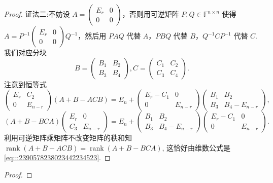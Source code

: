 \documentclass[../../main.tex]{subfiles}
\begin{document}
\begin{proof}
{\color{blue}证法二:}不妨设 $A = \begin{pmatrix} E_r & 0 \\ 0 & 0 \end{pmatrix}$，否则用可逆矩阵 $P, Q \in \mathbb{F}^{n \times n}$ 使得 $A = P^{-1} \begin{pmatrix} E_r & 0 \\ 0 & 0 \end{pmatrix} Q^{-1}$，然后用 $PAQ$ 代替 $A$，$PBQ$ 代替 $B$，$Q^{-1}CP^{-1}$ 代替 $C$. 我们对应分块
\[
B = \begin{pmatrix} B_1 & B_2 \\ B_3 & B_4 \end{pmatrix}, C = \begin{pmatrix} C_1 & C_2 \\ C_3 & C_4 \end{pmatrix}.
\]
注意到恒等式
\[
\begin{pmatrix}
E_r & C_2 \\
0 & E_{n - r}
\end{pmatrix}(A + B - ACB) = E_n + \begin{pmatrix}
E_r - C_1 & 0 \\
0 & E_{n - r}
\end{pmatrix}\begin{pmatrix}
B_1 & B_2 \\
B_3 & B_4 - E_{n - r}
\end{pmatrix},
\]
\[
(A + B - BCA)\begin{pmatrix}
E_r & 0 \\
C_3 & E_{n - r}
\end{pmatrix} = E_n + \begin{pmatrix}
B_1 & B_2 \\
B_3 & B_4 - E_{n - r}
\end{pmatrix}\begin{pmatrix}
E_r - C_1 & 0 \\
0 & E_{n - r}
\end{pmatrix}.
\]
利用可逆矩阵乘矩阵不改变矩阵的秩和知 $\operatorname{rank}(A + B - ACB) = \operatorname{rank}(A + B - BCA)$, 这恰好由维数公式是\eqref{eq:::2390578238023442234523}. 
\end{proof}

\begin{example}

\end{example}
\begin{proof}

\end{proof}
\end{document}
